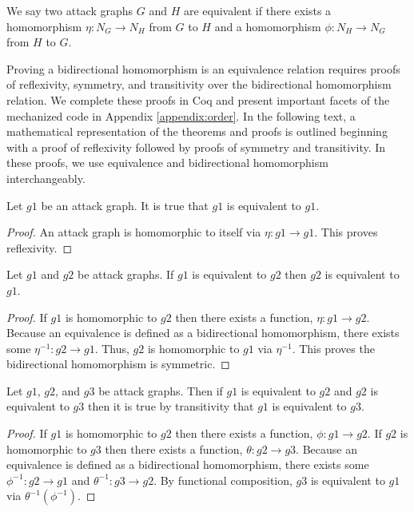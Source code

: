 \documentclass[runningheads]{llncs}
\theoremstyle{definition}
\begin{document}
\begin{definition}
    We say two attack graphs $G$ and $H$ are equivalent if there exists a  homomorphism $\eta : N_G \to N_H$ from $G$ to $H$ and a homomorphism $\phi : N_H \to N_G$ from $H$ to $G$.
\end{definition}

Proving a bidirectional homomorphism is an equivalence relation requires proofs of reflexivity, symmetry, and transitivity over the bidirectional homomorphism relation. We complete these proofs in Coq and present important facets of the mechanized code in Appendix \ref{appendix:order}. In the following text, a mathematical representation of the theorems and proofs is outlined beginning with a proof of reflexivity followed by proofs of symmetry and transitivity. In these proofs, we use equivalence and bidirectional homomorphism interchangeably.

\begin{theorem}
    Let $g1$ be an attack graph. It is true that $g1$ is equivalent to $g1$.
\end{theorem}
\begin{proof}
    An attack graph is homomorphic to itself via $\eta : g1 \to g1$. This proves reflexivity. 
\end{proof}

\begin{theorem}
    Let $g1$ and $g2$ be attack graphs. If $g1$ is equivalent to $g2$ then $g2$ is equivalent to $g1$. 
\end{theorem}
\begin{proof}
    If $g1$ is homomorphic to $g2$ then there exists a function, $\eta : g1 \to g2$. Because an equivalence is defined as a bidirectional homomorphism, there exists some $\eta^{-1} : g2 \to g1$. Thus, $g2$ is homomorphic to $g1$ via $\eta^{-1}$. This proves the bidirectional homomorphism is symmetric. 
\end{proof}

\begin{theorem}
    Let $g1$, $g2$, and $g3$ be attack graphs. Then if $g1$ is equivalent to $g2$ and $g2$ is equivalent to $g3$ then it is true by transitivity that $g1$ is equivalent to $g3$.   
\end{theorem}
\begin{proof}
    If $g1$ is homomorphic to $g2$ then there exists a function, $\phi : g1 \to g2$. If $g2$ is homomorphic to $g3$ then there exists a function, $\theta : g2 \to g3$. Because an equivalence is defined as a bidirectional homomorphism, there exists some $\phi^{-1} : g2 \to g1$ and $\theta^{-1} : g3 \to g2$. By functional composition, $g3$ is equivalent to $g1$ via $\theta^{-1} (\phi^{-1}).$
\end{proof}
\end{document}
